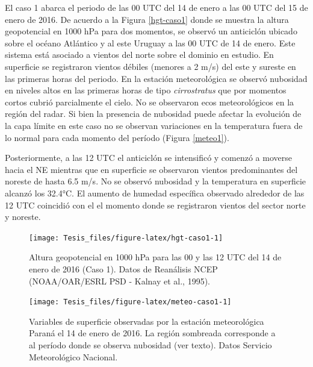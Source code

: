 \documentclass[12pt,spanish,oneside]{book}
\begin{document}
El caso 1 abarca el periodo de las 00 UTC del 14 de enero a las 00 UTC
del 15 de enero de 2016. De acuerdo a la Figura \ref{hgt-caso1} donde se
muestra la altura geopotencial en 1000 hPa para dos momentos, se observó
un anticiclón ubicado sobre el océano Atlántico y al este Uruguay a las
00 UTC de 14 de enero. Este sistema está asociado a vientos del norte
sobre el dominio en estudio. En superficie se registraron vientos
débiles (menores a 2 m/s) del este y sureste en las primeras horas del
periodo. En la estación meteorológica se observó nubosidad en niveles
altos en las primeras horas de tipo \emph{cirrostratus} que por momentos
cortos cubrió parcialmente el cielo. No se observaron ecos
meteorológicos en la región del radar. Si bien la presencia de nubosidad
puede afectar la evolución de la capa límite en este caso no se observan
variaciones en la temperatura fuera de lo normal para cada momento del
período (Figura \ref{meteo1}).

Posteriormente, a las 12 UTC el anticiclón se intensificó y comenzó a
moverse hacia el NE mientras que en superficie se observaron vientos
predominantes del noreste de hasta 6.5 m/s. No se observó nubosidad y la
temperatura en superficie alcanzó los 32.4°C. El aumento de humedad
específica observado alrededor de las 12 UTC coincidió con el el momento
donde se registraron vientos del sector norte y noreste.

\begin{figure}

{\centering \texttt{[image: Tesis\_files/figure-latex/hgt-caso1-1]} 

}

\caption{Altura geopotencial en 1000 hPa para las 00 y las 12 UTC del 14 de enero de 2016 (Caso 1). Datos de Reanálisis NCEP (NOAA/OAR/ESRL PSD - Kalnay et al., 1995). \label{hgt-caso1}}\label{fig:hgt-caso1}
\end{figure}

\begin{figure}

{\centering \texttt{[image: Tesis\_files/figure-latex/meteo-caso1-1]} 

}

\caption{Variables de superficie observadas por la estación meteorológica Paraná el 14 de enero de 2016. La región sombreada corresponde a al período donde se observa nubosidad (ver texto). Datos Servicio Meteorológico Nacional. \label{meteo1}}\label{fig:meteo-caso1}
\end{figure}
\end{document}
